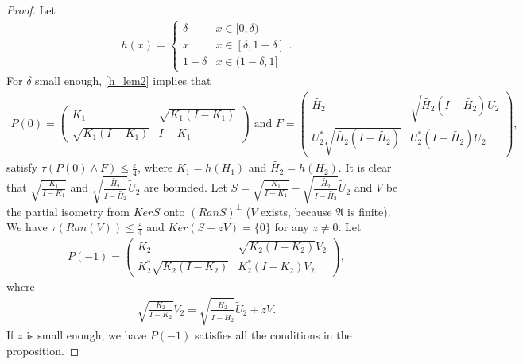 \documentclass[a4paper,10pt]{amsart}
\newcommand{\AAA}{\mathfrak A}
\begin{document}
\begin{proof}
    Let
    \begin{align*}
        h(x) = \begin{cases}
           \delta & x \in [0, \delta)\\
            x & x \in [\delta, 1-\delta]\\
            1-\delta & x \in (1-\delta, 1]
           \end{cases}. 
    \end{align*}
    For $\delta$ small enough, \cref{h_lem2} implies that 
    \begin{align*}
        P(0) = \begin{pmatrix}
            K_{1} & 
            \sqrt{K_{1}(I-K_{1})}\\
            \sqrt{K_{1}(I-K_{1})} 
            & I-K_1
        \end{pmatrix} \mbox{ and } 
        F = \begin{pmatrix}
            \widetilde{H_{2}} 
            & \sqrt{\widetilde{H_{2}}(I-\widetilde{H_{2}})}U_{2}\\
            U_{2}^{*}\sqrt{\widetilde{H_{2}}(I-\widetilde{H_{2}})} 
            & U_{2}^{*}(I-\widetilde{H_2})U_{2}
        \end{pmatrix}, 
    \end{align*}
    satisfy $\tau(P(0) \wedge F) \leq \frac{\varepsilon}{4}$,
    where $K_{1} = h(H_1)$ and $\widetilde{H_{2}} = h(H_2)$.
    It is clear that $\sqrt{\frac{K_1}{I-K_1}}$ and
    $\sqrt{\frac{\widetilde{H_2}}{I-\widetilde{H_2}}}
    \widetilde{U}_{2}$ are bounded. Let 
    $S = \sqrt{\frac{K_1}{I-K_1}} - 
    \sqrt{\frac{\widetilde{H_2}}{I-\widetilde{H_2}}}\widetilde{U}_2$
    and $V$ be the partial isometry from $KerS$ onto $(RanS)^{\perp}$
    ($V$ exists, because $\AAA$ is finite). We 
    have $\tau(Ran(V)) \leq \frac{\varepsilon}{4}$ and 
    $Ker(S + zV) = \{0\}$ for any $z \neq 0$.
    Let 
    \begin{align*}
        P(-1) = \begin{pmatrix}
            K_{2} & \sqrt{K_{2}(I-K_{2})}V_{2}\\
            K_{2}^{*}\sqrt{K_{2}(I-K_{2})} & K_{2}^{*}(I-K_2)V_{2}
        \end{pmatrix},
    \end{align*}
    where
    \begin{align*}
        \sqrt{\frac{K_2}{I-K_2}}V_2 = 
    \sqrt{\frac{\widetilde{H_2}}{I-\widetilde{H_2}}}\widetilde{U}_2 + 
     zV.
    \end{align*}
    If $z$ is small enough, we have $P(-1)$ satisfies all the
    conditions in the proposition.
\end{proof}
\end{document}
